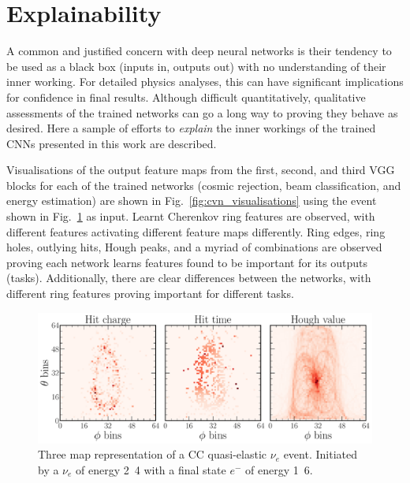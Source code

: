 \section{Explainability} %
\label{sec:cvn_explain} %

A common and justified concern with deep neural networks is their tendency to be used as a black
box (inputs in, outputs out) with no understanding of their inner working. For detailed physics
analyses, this can have significant implications for confidence in final results. Although
difficult quantitatively, qualitative assessments of the trained networks can go a long way to
proving they behave as desired. Here a sample of efforts to \emph{explain} the inner workings of
the trained CNNs presented in this work are described.

Visualisations of the output feature maps from the first, second, and third VGG blocks for each of
the trained networks (cosmic rejection, beam classification, and energy estimation) are shown in
Fig.~\ref{fig:cvn_visualisations} using the event shown in Fig.~\ref{fig:explain_example_event} as
input. Learnt Cherenkov ring features are observed, with different features activating different
feature maps differently. Ring edges, ring holes, outlying hits, Hough peaks, and a myriad of
combinations are observed proving each network learns features found to be important for its
outputs (tasks). Additionally, there are clear differences between the networks, with different
ring features proving important for different tasks.

\begin{figure} %
    \includegraphics[width=\textwidth]{diagrams/6-cvn/chipsnet/explain_example_event.pdf}
    \caption[Example CC quasi-elastic $\nu_{e}$ event for explainability.]
    {Three map representation of a CC quasi-elastic $\nu_{e}$ event. Initiated by a $\nu_{e}$ of
        energy \unit{2.4}{\GeV} with a final state $e^{-}$ of energy \unit{1.6}{\GeV}.}
    \label{fig:explain_example_event}
\end{figure}

